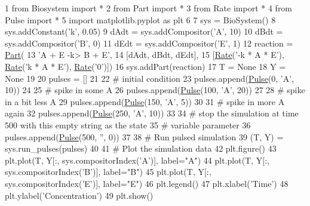\begin{DoxyCode}
1 \textcolor{keyword}{from} Biosystem \textcolor{keyword}{import} *
2 \textcolor{keyword}{from} Part \textcolor{keyword}{import} *
3 \textcolor{keyword}{from} Rate \textcolor{keyword}{import} *
4 \textcolor{keyword}{from} Pulse \textcolor{keyword}{import} *
5 \textcolor{keyword}{import} matplotlib.pyplot \textcolor{keyword}{as} plt
6 
7 sys = BioSystem()
8 sys.addConstant(\textcolor{stringliteral}{'k'}, 0.05)
9 dAdt = sys.addCompositor(\textcolor{stringliteral}{'A'}, 10)
10 dBdt = sys.addCompositor(\textcolor{stringliteral}{'B'}, 0)
11 dEdt = sys.addCompositor(\textcolor{stringliteral}{'E'}, 1)
12 reaction  = \hyperlink{namespacePart}{Part}(
13 \textcolor{stringliteral}{'A + E -k> B + E'},
14 [dAdt, dBdt, dEdt],
15 [\hyperlink{namespaceRate}{Rate}(\textcolor{stringliteral}{'-k * A * E'}), \hyperlink{namespaceRate}{Rate}(\textcolor{stringliteral}{'k * A * E'}), \hyperlink{namespaceRate}{Rate}(\textcolor{stringliteral}{'0'})])
16 sys.addPart(reaction)
17 T = \textcolor{keywordtype}{None}
18 Y = \textcolor{keywordtype}{None}
19 
20 pulses = []
21 
22 \textcolor{comment}{# initial condition}
23 pulses.append(\hyperlink{namespacePulse}{Pulse}(0, \textcolor{stringliteral}{'A'}, 10))
24 
25 \textcolor{comment}{# spike in some A}
26 pulses.append(\hyperlink{namespacePulse}{Pulse}(100, \textcolor{stringliteral}{'A'}, 20))
27 
28 \textcolor{comment}{# spike in a bit less A}
29 pulses.append(\hyperlink{namespacePulse}{Pulse}(150, \textcolor{stringliteral}{'A'}, 5))
30 
31 \textcolor{comment}{# spike in more A again}
32 pulses.append(\hyperlink{namespacePulse}{Pulse}(250, \textcolor{stringliteral}{'A'}, 10))
33 
34 \textcolor{comment}{# stop the simulation at time 500 with this empty string as the state}
35 \textcolor{comment}{# variable parameter}
36 pulses.append(\hyperlink{namespacePulse}{Pulse}(500, \textcolor{stringliteral}{''}, 0))
37 
38 \textcolor{comment}{# Run pulsed simulation}
39 (T, Y) = sys.run\_pulses(pulses)
40 
41 \textcolor{comment}{# Plot the simulation data}
42 plt.figure()
43 plt.plot(T, Y[:, sys.compositorIndex(\textcolor{stringliteral}{'A'})], label=\textcolor{stringliteral}{"A"})
44 plt.plot(T, Y[:, sys.compositorIndex(\textcolor{stringliteral}{'B'})], label=\textcolor{stringliteral}{"B"})
45 plt.plot(T, Y[:, sys.compositorIndex(\textcolor{stringliteral}{'E'})], label=\textcolor{stringliteral}{"E"})
46 plt.legend()
47 plt.xlabel(\textcolor{stringliteral}{'Time'})
48 plt.ylabel(\textcolor{stringliteral}{'Concentration'})
49 plt.show()
\end{DoxyCode}



